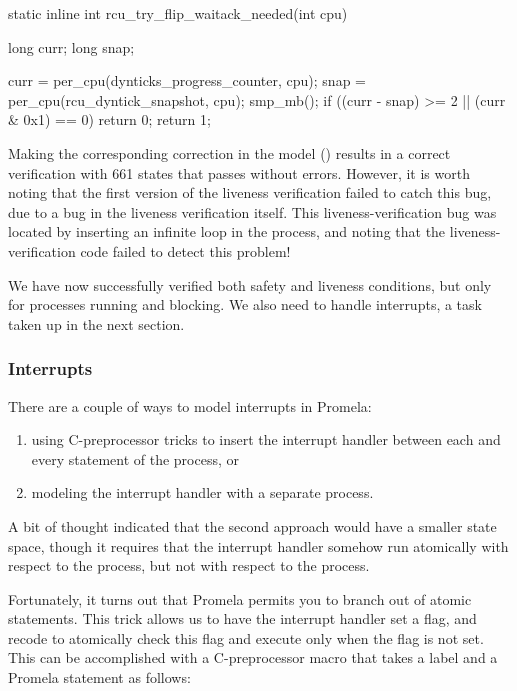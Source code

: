 \begin{VerbatimN}[commandchars=\\\[\]]
static inline int
rcu_try_flip_waitack_needed(int cpu)
{
	long curr;
	long snap;

	curr = per_cpu(dynticks_progress_counter, cpu);
	snap = per_cpu(rcu_dyntick_snapshot, cpu);
	smp_mb();
	if ((curr - snap) >= 2 || (curr & 0x1) == 0)
		return 0;
	return 1;
}
\end{VerbatimN}

Making the corresponding correction in the
model ()
results in a correct verification with 661 states that passes without
errors.
However, it is worth noting that the first version of the liveness
verification failed to catch this bug, due to a bug in the liveness
verification itself.
This liveness-verification bug was located by inserting an infinite
loop in the  process, and noting that
the liveness-verification code failed to detect this problem!

We have now successfully verified both safety and liveness
conditions, but only for processes running and blocking.
We also need to handle interrupts, a task taken up in the next section.

\subsubsection{Interrupts}
\label{sec:formal:Interrupts}

There are a couple of ways to model interrupts in Promela:
\begin{enumerate}
\item	using C-preprocessor tricks to insert the interrupt handler
	between each and every statement of the 
	process, or
\item	modeling the interrupt handler with a separate process.
\end{enumerate}

A bit of thought indicated that the second approach would have a
smaller state space, though it requires that the interrupt handler
somehow run atomically with respect to the 
process, but not with respect to the 
process.

Fortunately, it turns out that Promela permits you to branch
out of atomic statements.
This trick allows us to have the interrupt handler set a flag, and
recode  to atomically check this flag
and execute only when the flag is not set.
This can be accomplished with a C-preprocessor macro that takes
a label and a Promela statement as follows:

